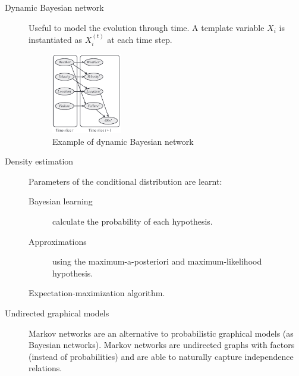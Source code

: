 \begin{description}
    \item[Dynamic Bayesian network] 
        Useful to model the evolution through time.
        A template variable $X_i$ is instantiated as $X_i^{(t)}$ at each time step.
        \begin{figure}[h]
            \centering
            \includegraphics[width=0.3\textwidth]{img/_dynamic_bn_example.pdf}
            \caption{Example of dynamic Bayesian network}
        \end{figure}

    \item[Density estimation] 
        Parameters of the conditional distribution are learnt:
        \begin{description}
            \item[Bayesian learning] calculate the probability of each hypothesis.
            \item[Approximations] using the maximum-a-posteriori and maximum-likelihood hypothesis.
            \item[Expectation-maximization algorithm{\normalfont.}] 
        \end{description}

    \item[Undirected graphical models] 
        Markov networks are an alternative to probabilistic graphical models (as Bayesian networks).
        Markov networks are undirected graphs with factors (instead of probabilities) and
        are able to naturally capture independence relations.
\end{description}